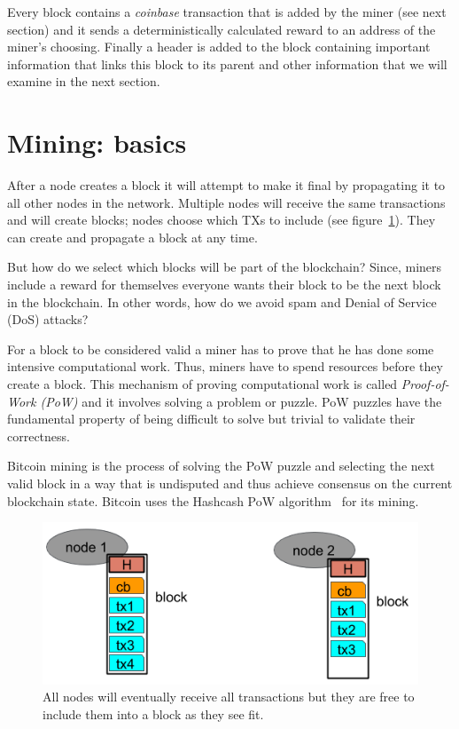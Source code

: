 Every block contains a \emph{coinbase} transaction that is added by the miner (see next section) and it sends a deterministically calculated reward to an address of the miner's choosing. Finally a header is added to the block containing important information that links this block to its parent and other information that we will examine in the next section.

\section{Mining: basics}
After a node creates a block it will attempt to make it final by propagating it to all other nodes in the network. Multiple nodes will receive the same transactions and will create blocks; nodes choose which TXs to include (see figure~\ref{fig:different-nodes-mining}). They can create and propagate a block at any time.

\begin{emphbox}
But how do we select which blocks will be part of the blockchain? Since, miners include a reward for themselves everyone wants their block to be the next block in the blockchain. In other words, how do we avoid spam and Denial of Service (DoS) attacks?
\end{emphbox}

For a block to be considered valid a miner has to prove that he has done some intensive computational work. Thus, miners have to spend resources before they create a block. This mechanism of proving computational work is called \emph{Proof-of-Work (PoW)} and it involves solving a problem or puzzle. PoW puzzles have the fundamental property of being difficult to solve but trivial to validate their correctness. 

Bitcoin mining is the process of solving the PoW puzzle and selecting the next valid block in a way that is undisputed and thus achieve consensus on the current blockchain state. Bitcoin uses the Hashcash PoW algorithm~\cite{Back2002-hashcash} for its mining.

\begin{figure}[h]
\begin{center}
\includegraphics[scale=0.5]{images/different-nodes-mining}
\caption{All nodes will eventually receive all transactions but they are free to include them into a block as they see fit.}
\label{fig:different-nodes-mining}
\end{center}
\end{figure}

